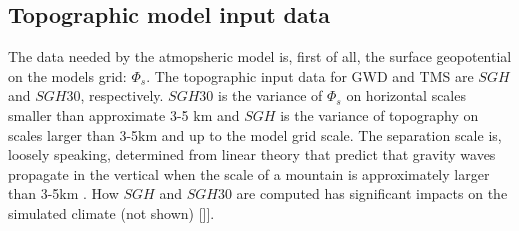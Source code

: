 \documentclass[gmd]{copernicus}
\begin{document}
\subsection{Topographic model input data}
The data needed by the atmopsheric model is, first of all, the surface geopotential on the models grid: $\Phi_s$. The topographic input data for GWD and TMS are $SGH$ and $SGH30$, respectively. $SGH30$ is the variance of $\Phi_s$ on horizontal scales smaller than approximate 3-5 km and $SGH$ is the variance of topography on scales larger than 3-5km and up to the model grid scale. The separation scale is, loosely speaking, determined from linear theory that predict that gravity waves propagate in the vertical when the scale of a mountain is approximately larger than 3-5km \citep[e.g.,][]{Durran,BBW2004QJRMS}. How $SGH$ and $SGH30$ are computed has significant impacts on the simulated climate (not shown) [{\color{red}{we could consider showing some results - especially since CAM5.4/5 is using the new topo}}]].


{\color{red}{Julio: please describe input data of ridges ...}}
\end{document}
